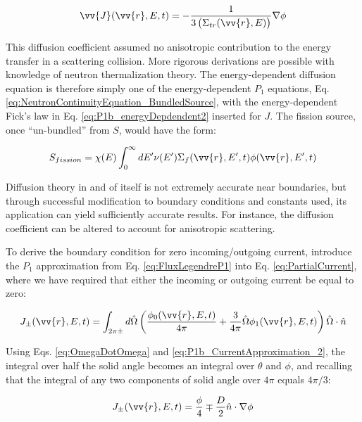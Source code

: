 \documentclass[10pt]{article}
\newcommand{\hO}{\hat{\Omega}}
\begin{document}
\begin{flushleft}
\begin{equation}
\label{eq:P1b_energyDepdendent2}
\vv{J}(\vv{r}, E, t) = -\frac{1}{3\left(\Sigma_{tr}(\vv{r},E)\right)}\nabla\phi
\end{equation}

This diffusion coefficient assumed no anisotropic contribution to the energy transfer in a scattering collision. More rigorous derivations are possible with knowledge of neutron thermalization theory. The energy-dependent diffusion equation is therefore simply one of the energy-dependent \(P_1\) equations, Eq. \ref{eq:NeutronContinuityEquation_BundledSource}, with the energy-dependent Fick's law in Eq. \ref{eq:P1b_energyDepdendent2} inserted for \(J\). The fission source, once ``un-bundled'' from \(S\), would have the form:

\begin{equation}
\label{eq:FissionSource}
S_{fission}=\chi(E)\int_{0}^{\infty}dE'\nu(E')\Sigma_f(\vv{r}, E', t)\phi(\vv{r}, E', t)
\end{equation}

Diffusion theory in and of itself is not extremely accurate near boundaries, but through successful modification to boundary conditions and constants used, its application can yield sufficiently accurate results. For instance, the diffusion coefficient can be altered to account for anisotropic scattering. 

To derive the boundary condition for zero incoming/outgoing current, introduce the \(P_1\) approximation from Eq. \ref{eq:FluxLegendreP1} into Eq. \ref{eq:PartialCurrent}, where we have required that either the incoming or outgoing current be equal to zero:

\begin{equation}
\label{eq:PartialCurrent_BC1}
J_\pm (\vv{r}, E, t) = \int_{2\pi\pm}^{} d\hO   \left(\frac{\phi_0(\vv{r}, E, t)}{4\pi} + \frac{3}{4\pi} \hO  \phi_1(\vv{r}, E, t)\right)\hO  \cdot\hat{n}
\end{equation}

Using Eqs. \ref{eq:OmegaDotOmega} and \ref{eq:P1b_CurrentApproximation_2}, the integral over half the solid angle becomes an integral over \(\theta\) and \(\phi\), and recalling that the integral of any two components of solid angle over \(4\pi\) equals \(4\pi/3\):

\begin{equation}
\label{eq:PartialCurrent_BC2}
J_\pm (\vv{r}, E, t) = \frac{\phi}{4} \mp \frac{D}{2}\hat{n}\cdot\nabla\phi
\end{equation}


\end{flushleft}
\end{document}
